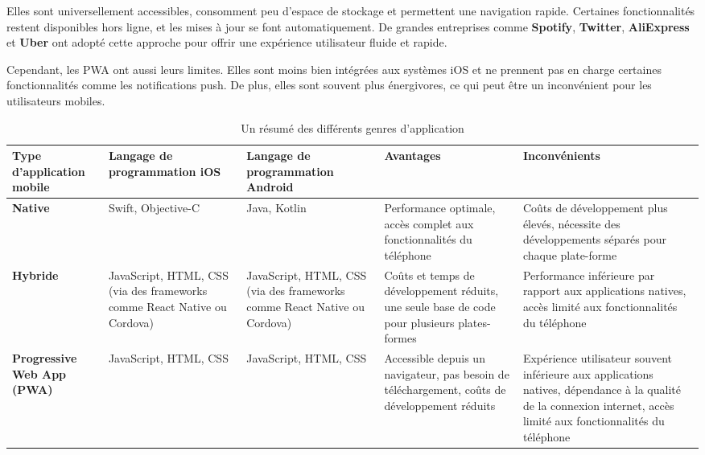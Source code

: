 Elles sont universellement accessibles, consomment peu d’espace de stockage et permettent une navigation rapide. Certaines fonctionnalités restent disponibles hors ligne, et les mises à jour se font automatiquement. De grandes entreprises comme \textbf{Spotify}, \textbf{Twitter}, \textbf{AliExpress} et \textbf{Uber} ont adopté cette approche pour offrir une expérience utilisateur fluide et rapide\cite{definition-application-mobile}.  

Cependant, les \gls{PWA} ont aussi leurs limites. Elles sont moins bien intégrées aux systèmes iOS et ne prennent pas en charge certaines fonctionnalités comme les notifications push. De plus, elles sont souvent plus énergivores, ce qui peut être un inconvénient pour les utilisateurs mobiles.  


\begin{table}[h]
   \centering
   \renewcommand{\arraystretch}{1.5}
   \setlength{\tabcolsep}{5pt}
   \begin{tabular}{|p{2.5cm}|p{3cm}|p{3cm}|p{3.5cm}|p{4.5cm}|}
       \hline
       \textbf{Type d’application mobile} & \textbf{Langage de programmation iOS} & \textbf{Langage de programmation Android} & \textbf{Avantages} & \textbf{Inconvénients} \\
       \hline
       \textbf{Native} & Swift, Objective-C & Java, Kotlin & Performance optimale, accès complet aux fonctionnalités du téléphone & Coûts de développement plus élevés, nécessite des développements séparés pour chaque plate-forme \\
       \hline
       \textbf{Hybride} & JavaScript, \gls{HTML}, \gls{CSS} (via des frameworks comme React Native ou Cordova) & JavaScript, \gls{HTML}, \gls{CSS} (via des frameworks comme React Native ou Cordova) & Coûts et temps de développement réduits, une seule base de code pour plusieurs plates-formes & Performance inférieure par rapport aux applications natives, accès limité aux fonctionnalités du téléphone \\
       \hline
       \textbf{Progressive Web App (\gls{PWA})} & JavaScript, \gls{HTML}, \gls{CSS}  & JavaScript, \gls{HTML}, \gls{CSS} & Accessible depuis un navigateur, pas besoin de téléchargement, coûts de développement réduits & Expérience utilisateur souvent inférieure aux applications natives, dépendance à la qualité de la connexion internet, accès limité aux fonctionnalités du téléphone \\
       \hline
   \end{tabular}
   \caption{Un résumé des différents genres d’application}
   \label{tab:types_app}
\end{table}

